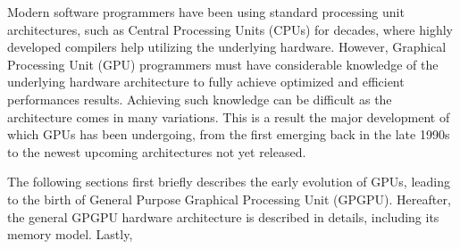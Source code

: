 Modern software programmers have been using standard processing unit architectures, such as Central Processing Units (CPUs) for decades, where highly developed compilers help utilizing the underlying hardware.
However, Graphical Processing Unit (GPU) programmers must have considerable knowledge of the underlying hardware architecture to fully achieve optimized and efficient performances results.
Achieving such knowledge can be difficult as the architecture comes in many variations.
This is a result the major development of which GPUs has been undergoing, from the first emerging back in the late 1990s to the newest upcoming architectures not yet released.

The following sections first briefly describes the early evolution of GPUs, leading to the birth of General Purpose Graphical Processing Unit (GPGPU).
Hereafter, the general GPGPU hardware architecture is described in details, including its memory model.
Lastly, 




 